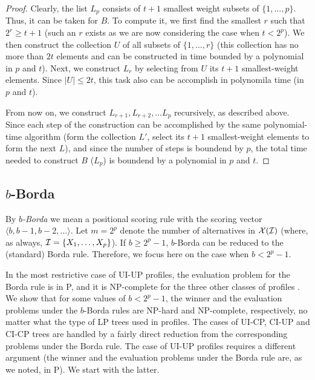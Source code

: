 \begin{proof}
Clearly, the list $L_p$ consists of $t+1$ smallest weight subsets of
$\{1,\ldots,p\}$. Thus, it can be taken for $B$. To compute it, we first
find the smallest $r$ such that $2^r\geq t+1$ (such an $r$ exists as
we are now considering the case when $t < 2^p$). We then construct the 
collection $U$ of all subsets of $\{1,\ldots, r\}$ (this collection 
has no more than $2t$ elements and can be constructed in time bounded 
by a polynomial in $p$ and $t$). Next, we construct $L_r$ by selecting 
from $U$ its $t+1$ smallest-weight elements. Since $|U|\leq 2t$, this task
also can be accomplish in polynomila time (in $p$ and $t$).

From now on, we construct $L_{r+1},L_{r+2},\ldots L_p$ recursively, as 
described above. Since each step of the construction can be accomplished
by the same polynomial-time algorithm (form the collection $L'$, select
its $t+1$ smallest-weight elements to form the next $L$), and since
the number of steps is boundend by $p$, the total time needed to construct
$B$ ($L_p$) is boundend by a polynomial in $p$ and $t$.  
\end{proof}


\subsection{$b$-Borda}
By \emph{$b$-Borda} we mean a positional scoring rule with the scoring 
vector $\langle b,b-1,b-2,\ldots\rangle$. Let $m=2^p$ denote the number 
of alternatives in $\mathcal{X}(\mathcal{I})$ (where, as always, $\mathcal{I} =\{X_1,\ldots, 
X_p\}$). If $b \geq 2^p-1$, $b$-Borda can be reduced to the (standard) 
Borda rule. Therefore, we focus here on the case when $b < 2^p-1$.

In the most restrictive case of UI-UP profiles, the evaluation problem 
for the Borda rule is in P, and it is NP-complete for the three other 
classes of profiles \cite{lang:aggLP}. We show that for some values
of $b < 2^p-1$, the winner and the evaluation problems under the 
$b$-Borda rules are NP-hard and NP-complete, respectively, no matter
what the type of LP trees used in profiles. The cases of UI-CP, CI-UP
and CI-CP trees are handled by a fairly direct reduction from the 
corresponding problems under the Borda rule. The case of UI-UP profiles
requires a different argument (the winner and the evaluation problems 
under the Borda rule are, as we noted, in P). We start with the latter. 

